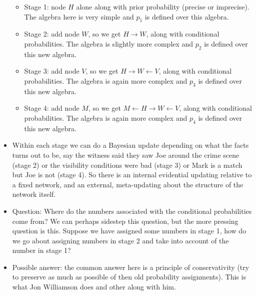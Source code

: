 \documentclass[
  11pt,
  dvipsnames,enabledeprecatedfontcommands]{scrartcl}
\begin{document}
\begin{itemize}
  \begin{itemize}
  \item
    Stage 1: node \(H\) alone along with prior probability (precise or
    imprecise). The algebra here is very simple and \(p_1\) is defined
    over this algebra.
  \item
    Stage 2: add node \(W\), so we get \(H \rightarrow W\), along with
    conditional probabilities. The algebra is slightly more complex and
    \(p_2\) is defined over this new algebra.
  \item
    Stage 3: add node \(V\), so we get \(H \rightarrow W \leftarrow V\),
    along with conditional probabilities. The algebra is again more
    complex and \(p_3\) is defined over this new algebra.
  \item
    Stage 4: add node \(M\), so we get
    \(M \leftarrow H \rightarrow W \leftarrow V\), along with
    conditional probabilities. The algebra is again more complex and
    \(p_4\) is defined over this new algebra.
  \end{itemize}
\item
  Within each stage we can do a Bayesian update depending on what the
  facts turns out to be, say the witness said they saw Joe around the
  crime scene (stage 2) or the visibility conditions were bad (stage 3)
  or Mark is a match but Joe is not (stage 4). So there is an internal
  evidential updating relative to a fixed network, and an external,
  meta-updating about the structure of the network itself.
\item
  Question: Where do the numbers associated with the conditional
  probabilities come from? We can perhaps sidestep this question, but
  the more pressing question is this. Suppose we have assigned some
  numbers in stage 1, how do we go about assigning numbers in stage 2
  and take into account of the number in stage 1?
\item
  Possible answer: the common answer here is a principle of
  conservativity (try to preserve as much as possible of then old
  probability assignments). This is what Jon Williamson does and other
  along with him.
\end{itemize}
\end{document}

